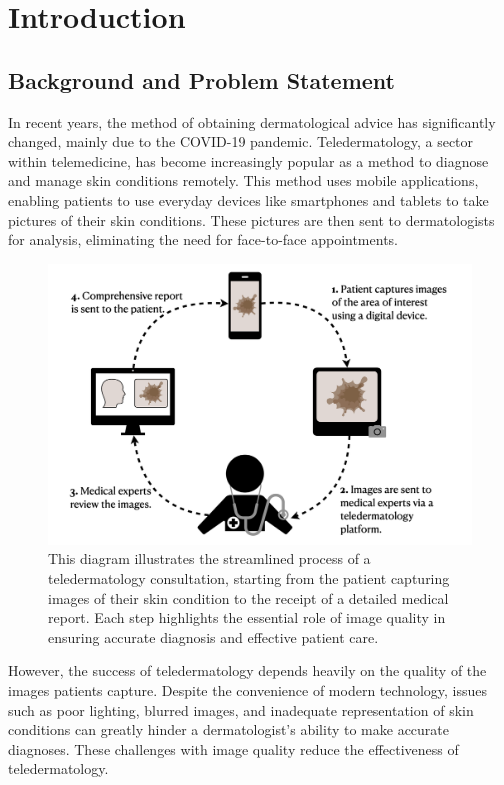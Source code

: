 \chapter{Introduction}
\label{ch:Introduction}

\section{Background and Problem Statement}
\label{sec:BackgroundProblemStatement}
In recent years, the method of obtaining dermatological advice has significantly changed, mainly due to the COVID-19 pandemic. Teledermatology, a sector within telemedicine, has become increasingly popular as a method to diagnose and manage skin conditions remotely. This method uses mobile applications, enabling patients to use everyday devices like smartphones and tablets to take pictures of their skin conditions. These pictures are then sent to dermatologists for analysis, eliminating the need for face-to-face appointments. \par
\vspace{\baselineskip}
\begin{figure}[ht]
    \centering
    \includegraphics[keepaspectratio,width=15cm]{img/TD_workflow.png}
    \caption{This diagram illustrates the streamlined process of a teledermatology consultation, starting from the patient capturing images of their skin condition to the receipt of a detailed medical report. Each step highlights the essential role of image quality in ensuring accurate diagnosis and effective patient care.}
    \label{fig:TD_workflow}
\end{figure}
However, the success of teledermatology depends heavily on the quality of the images patients capture. Despite the convenience of modern technology, issues such as poor lighting, blurred images, and inadequate representation of skin conditions can greatly hinder a dermatologist's ability to make accurate diagnoses. These challenges with image quality reduce the effectiveness of teledermatology. \par
